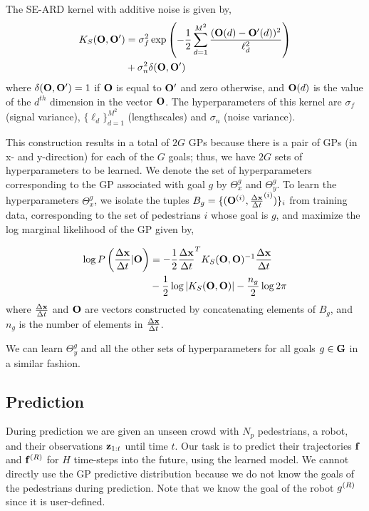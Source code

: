 The SE-ARD kernel with additive noise is given by,
\begin{align}
  \label{eqn:kernel}
  \begin{split}
    K_{S}(\mathbf{O}, \mathbf{O}') &= \sigma_f^2 \exp\left(-\frac{1}{2}\sum_{d=1}^{M^2} \frac{(\mathbf{O}(d) - \mathbf{O}'(d))^2}{\ell_d^2}\right) \\
    &+ \sigma_n^2 \delta(\mathbf{O}, \mathbf{O}')
  \end{split}
\end{align}
where $\delta(\mathbf{O},\mathbf{O}') = 1$ if $\mathbf{O}$ is equal to $\mathbf{O}'$
and zero otherwise, and $\mathbf{O}(d)$ is the value of the $d^{th}$
dimension in the vector $\mathbf{O}$. The hyperparameters of this kernel
are $\sigma_f$ (signal variance), $\{\ell_d\}_{d=1}^{M^{2}}$
(lengthscales) and $\sigma_n$ (noise variance).


This construction results in a total of $2G$ GPs because there is a
pair of GPs (in x- and y-direction) for each of the $G$ goals; thus,
we have $2G$ sets of hyperparameters to be learned. We denote the set
of hyperparameters corresponding to the GP associated with goal $g$ by
$\Theta_x^g$ and $\Theta_y^g$. To learn the hyperparameters
$\Theta_x^g$, we isolate the tuples
$B_g = \{(\mathbf{O}^{(i)}, \frac{\Delta \mathbf{x}}{\Delta t}^{(i)})\}_i$ from training data,
corresponding to the set of pedestrians $i$ whose goal is $g$, and
maximize the log marginal likelihood of the GP \cite{rasmussen06}
given by,
%
%

\begin{align}
  \label{eqn:logmarginal}
  \begin{split}
    \log P\left(\frac{\Delta \mathbf{x}}{\Delta t}|\mathbf{O}\right) &= -\frac{1}{2}\frac{\Delta \mathbf{x}}{\Delta t}^TK_S(\mathbf{O}, \mathbf{O})^{-1}\frac{\Delta \mathbf{x}}{\Delta t} \\
    &- \frac{1}{2}\log|K_S(\mathbf{O}, \mathbf{O})| - \frac{n_g}{2}\log 2\pi
  \end{split}
\end{align}
where $\frac{\Delta \mathbf{x}}{\Delta t}$ and $\mathbf{O}$ are vectors constructed by concatenating
elements of $B_g$, and $n_g$ is the number of elements in $\frac{\Delta \mathbf{x}}{\Delta t}$.

We can learn $\Theta_y^g$ and all the other sets of hyperparameters
for all goals $g \in \mathbf{G}$ in a similar fashion.
%
%
%
%
%

\subsection{Prediction}
\label{sec:prediction}

During prediction we are given an unseen crowd with $N_p$ pedestrians,
a robot, and their observations $\mathbf{z}_{1:t}$ until time $t$. Our
task is to predict their trajectories $\mathbf{f}$ and $\mathbf{f}^{(R)}$ for
$H$ time-steps into the future, using the learned model. We cannot
directly use the GP predictive distribution because we do not know the
goals of the pedestrians during prediction. Note that we know the goal
of the robot $g^{(R)}$ since it is user-defined.

